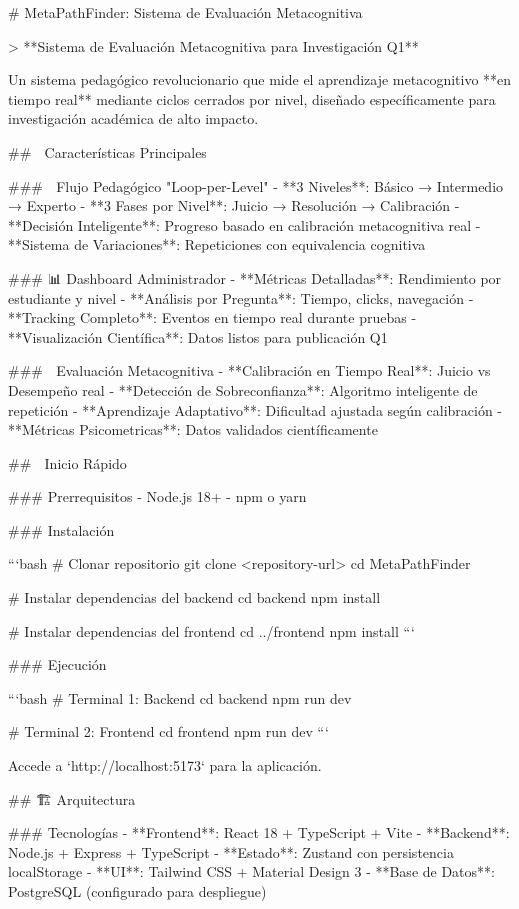 # MetaPathFinder: Sistema de Evaluación Metacognitiva

> **Sistema de Evaluación Metacognitiva para Investigación Q1**

Un sistema pedagógico revolucionario que mide el aprendizaje metacognitivo **en tiempo real** mediante ciclos cerrados por nivel, diseñado específicamente para investigación académica de alto impacto.

## 🎯 Características Principales

### 🔄 Flujo Pedagógico "Loop-per-Level"
- **3 Niveles**: Básico → Intermedio → Experto
- **3 Fases por Nivel**: Juicio → Resolución → Calibración
- **Decisión Inteligente**: Progreso basado en calibración metacognitiva real
- **Sistema de Variaciones**: Repeticiones con equivalencia cognitiva

### 📊 Dashboard Administrador
- **Métricas Detalladas**: Rendimiento por estudiante y nivel
- **Análisis por Pregunta**: Tiempo, clicks, navegación
- **Tracking Completo**: Eventos en tiempo real durante pruebas
- **Visualización Científica**: Datos listos para publicación Q1

### 🧠 Evaluación Metacognitiva
- **Calibración en Tiempo Real**: Juicio vs Desempeño real
- **Detección de Sobreconfianza**: Algoritmo inteligente de repetición
- **Aprendizaje Adaptativo**: Dificultad ajustada según calibración
- **Métricas Psicometricas**: Datos validados científicamente

## 🚀 Inicio Rápido

### Prerrequisitos
- Node.js 18+
- npm o yarn

### Instalación

```bash
# Clonar repositorio
git clone <repository-url>
cd MetaPathFinder

# Instalar dependencias del backend
cd backend
npm install

# Instalar dependencias del frontend
cd ../frontend
npm install
```

### Ejecución

```bash
# Terminal 1: Backend
cd backend
npm run dev

# Terminal 2: Frontend
cd frontend
npm run dev
```

Accede a `http://localhost:5173` para la aplicación.

## 🏗️ Arquitectura

### Tecnologías
- **Frontend**: React 18 + TypeScript + Vite
- **Backend**: Node.js + Express + TypeScript
- **Estado**: Zustand con persistencia localStorage
- **UI**: Tailwind CSS + Material Design 3
- **Base de Datos**: PostgreSQL (configurado para despliegue)

